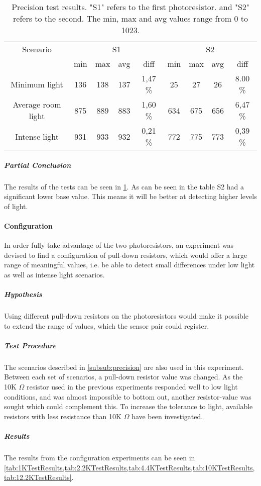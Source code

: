  \begin{table}[htbp]
    \centering
    \begin{tabular}{*{9}{c}}
      \toprule
      Scenario & \multicolumn{4}{c}{S1} & \multicolumn{4}{c}{S2} \\
      \cmidrule(rl){2-5} 
      \cmidrule(rl){6-9}
       & min & max & avg & diff & min & max & avg & diff \\ \midrule
      Minimum light & 136 & 138 & 137 & 1,47 \% & 25 & 27 & 26 & 8.00 \% \\
      Average room light & 875 & 889 & 883 & 1,60 \%  & 634 & 675 & 656 & 6,47 \% \\
      Intense light & 931 & 933 & 932 & 0,21 \%  & 772 & 775 & 773 & 0,39 \% \\ \bottomrule
    \end{tabular}
    \caption[Precision test results]{Precision test results. "S1" refers to the first photoresistor. and
      "S2" refers to the second. The min, max and avg values range from 0 to 1023.}\label{tab:precisionTestResults}
  \end{table}

\subparagraph{Partial Conclusion}
The results of the tests can be seen in \cref{tab:precisionTestResults}. As can be seen in the table S2 had a significant lower base value. This means it will be better at detecting higher levels of light.

\paragraph{Configuration}
In order fully take advantage of the two photoresistors, an experiment was devised to find a configuration of pull-down resistors, which would offer a large range of meaningful values, i.e. be able to detect small differences under low light as well as intense light scenarios.
\subparagraph{Hypothesis}
Using different pull-down resistors on the photoresistors would make it possible to extend the range of values, which the sensor pair could register.
\subparagraph{Test Procedure}
The scenarios described in \cref{subsub:precision} are also used in this experiment. Between each set of scenarios, a pull-down resistor value was changed. As the 10K $\Omega$ resistor used in the previous experiments responded well to low light conditions, and was almost impossible to bottom out, another resistor-value was sought which could complement this. To increase the tolerance to light, available resistors with less resistance than 10K $\Omega$ have been investigated.
\subparagraph{Results}
The results from the configuration experiments can be seen in \cref{tab:1KTestResults,tab:2.2KTestResults,tab:4.4KTestResults,tab:10KTestResults,tab:12.2KTestResults}.

